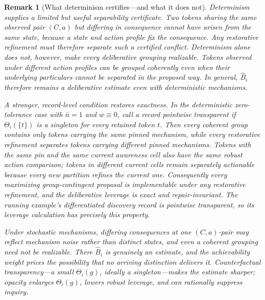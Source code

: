 \documentclass[11pt]{article}
\newtheorem{remark}[assumption]{Remark}
\theoremstyle{definition}
\begin{document}
\begin{remark}[What determinism certifies---and what it does not]
\label{rem:certification}
Determinism supplies a limited but useful separability certificate.
Two tokens sharing the same observed pair $(C,a)$ but differing in consequence cannot have arisen from the same state, because a state and action profile fix the consequence.
Any restorative refinement must therefore separate such a certified conflict.
Determinism alone does not, however, make every deliberative grouping realizable.
Tokens observed under different action profiles can be grouped coherently even when their underlying particulars cannot be separated in the proposed way.
In general, $\widehat B_i$ therefore remains a deliberative estimate even with deterministic mechanisms.

A stronger, record-level condition restores exactness.
In the deterministic zero-tolerance case with $\bar n=1$ and $w\equiv0$, call a record \emph{pointwise transparent} if $\Theta_i(\{t\})$ is a singleton for every retained token $t$.
Then every coherent group contains only tokens carrying the same pinned mechanism, while every restorative refinement separates tokens carrying different pinned mechanisms.
Tokens with the same pin and the same current awareness cell also have the same robust action comparison; tokens in different current cells remain separately actionable because every new partition refines the current one.
Consequently every maximizing group-contingent proposal is implementable under any restorative refinement, and the deliberative leverage is exact and repair-invariant.
The running example's differentiated discovery record is pointwise transparent, so its leverage calculation has precisely this property.

Under stochastic mechanisms, differing consequences at one $(C,a)$-pair may reflect mechanism noise rather than distinct states, and even a coherent grouping need not be realizable.
There $\widehat B_i$ is genuinely an estimate, and the achievability weight prices the possibility that no arriving distinction delivers it.
Counterfactual transparency---a small $\Theta_i(g)$, ideally a singleton---makes the estimate sharper; opacity enlarges $\Theta_i(g)$, lowers robust leverage, and can rationally suppress inquiry.
\end{remark}
\end{document}
